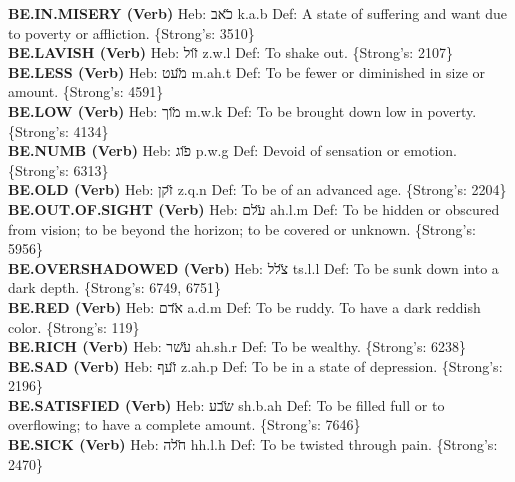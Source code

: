 {\textbf{BE.IN.MISERY (Verb)} Heb: {\large\H כאב} k.a.b Def: A state of suffering and want due to poverty or affliction. \{Strong's: 3510\}\hfill{}\\

\textbf{BE.LAVISH (Verb)} Heb: {\large\H זול} z.w.l Def: To shake out. \{Strong's: 2107\}\hfill{}\\

\textbf{BE.LESS (Verb)} Heb: {\large\H מעט} m.ah.t Def: To be fewer or diminished in size or amount. \{Strong's: 4591\}\hfill{}\\

\textbf{BE.LOW (Verb)} Heb: {\large\H מוך} m.w.k Def: To be brought down low in poverty. \{Strong's: 4134\}\hfill{}\\

\textbf{BE.NUMB (Verb)} Heb: {\large\H פוג} p.w.g Def: Devoid of sensation or emotion. \{Strong's: 6313\}\hfill{}\\

\textbf{BE.OLD (Verb)} Heb: {\large\H זקן} z.q.n Def: To be of an advanced age. \{Strong's: 2204\}\hfill{}\\

\textbf{BE.OUT.OF.SIGHT (Verb)} Heb: {\large\H עלם} ah.l.m Def: To be hidden or obscured from vision; to be beyond the horizon; to be covered or unknown. \{Strong's: 5956\}\hfill{}\\

\textbf{BE.OVERSHADOWED (Verb)} Heb: {\large\H צלל} ts.l.l Def: To be sunk down into a dark depth. \{Strong's: 6749, 6751\}\hfill{}\\

\textbf{BE.RED (Verb)} Heb: {\large\H אדם} a.d.m Def: To be ruddy. To have a dark reddish color. \{Strong's: 119\}\hfill{}\\

\textbf{BE.RICH (Verb)} Heb: {\large\H עשר} ah.sh.r Def: To be wealthy. \{Strong's: 6238\}\hfill{}\\

\textbf{BE.SAD (Verb)} Heb: {\large\H זעף} z.ah.p Def: To be in a state of depression. \{Strong's: 2196\}\hfill{}\\

\textbf{BE.SATISFIED (Verb)} Heb: {\large\H שבע} sh.b.ah Def: To be filled full or to overflowing; to have a complete amount. \{Strong's: 7646\}\hfill{}\\

\textbf{BE.SICK (Verb)} Heb: {\large\H חלה} hh.l.h Def: To be twisted through pain. \{Strong's: 2470\}\hfill{}\\

}
